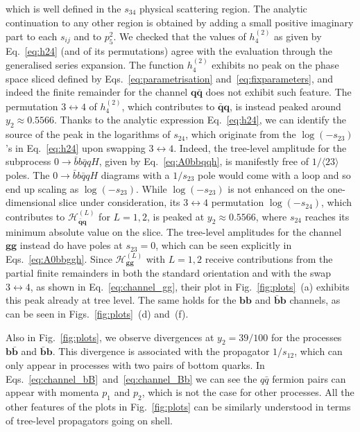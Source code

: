 \documentclass[main.tex]{subfiles}
\begin{document}
which is well defined in the $s_{34}$ physical scattering region. The analytic continuation to any other region is obtained by adding a small positive imaginary part to each $s_{ij}$ and to $p_5^2$. We checked that the values of $h^{(2)}_4$ as given by Eq.~\ref{eq:h24} (and of its permutations) agree with the evaluation through the generalised series expansion. The function $h^{(2)}_4$ exhibits no peak on the phase space sliced defined by Eqs.~\ref{eq:parametrisation} and~\ref{eq:fixparameters}, and indeed the finite remainder for the channel $\mathbf{q\bar{q}}$ does not exhibit such feature. The permutation $3\leftrightarrow 4$ of $h^{(2)}_4$, which contributes to $\mathbf{\bar{q}q}$, is instead peaked around $y_2 \approx 0.5566$. Thanks to the analytic expression Eq.~\ref{eq:h24}, we can identify the source of the peak in the logarithms of $s_{24}$, which originate from the $\log (-s_{23})$'s in Eq.~\ref{eq:h24} upon swapping $3\leftrightarrow 4$. Indeed, the tree-level amplitude for the subprocess $0\to\bar{b} b \bar{q} q H$, given by Eq.~\ref{eq:A0bbqqh}, is manifestly free of $1/\langle 23 \rangle$ poles. The $0\to\bar{b} b \bar{q} q H$ diagrams with a $1/s_{23}$ pole would come with a loop and so end up scaling as $\log(-s_{23})$. While $\log(-s_{23})$ is not enhanced on the one-dimensional slice under consideration, its $3\leftrightarrow4$ permutation $\log(-s_{24})$, which contributes to $\mathcal{H}^{(L)}_{\mathbf{\bar{q}q}}$ for $L=1,2$, is peaked at $y_2 \approx 0.5566$, where $s_{24}$ reaches its minimum absolute value on the slice. 
The tree-level amplitudes for the channel $\mathbf{gg}$ instead do have poles at $s_{23}=0$, which
can be seen explicitly in Eqs.~\ref{eq:A0bbggh}. Since $\mathcal{H}^{(L)}_{\mathbf{gg}}$ with
$L=1,2$ receive contributions from the partial finite remainders in both the standard orientation
and with the swap $3\leftrightarrow4$, as shown in Eq.~\ref{eq:channel_gg}, their plot in Fig.~\ref{fig:plots}~(a) exhibits this peak already at tree level. The same holds for the $\mathbf{bb}$ and $\mathbf{\bar{b}b}$ channels, as can be seen in Figs.~\ref{fig:plots}~(d) and~(f). 

Also in Fig.~\ref{fig:plots}, we observe divergences at $y_2 = 39/100$ for the processes
$\mathbf{b\bar{b}}$ and $\mathbf{\bar{b}b}$. This divergence is associated with the propagator
$1/s_{12}$, which can only appear in processes with two pairs of bottom quarks. In Eqs.~\ref{eq:channel_bB}~and~\ref{eq:channel_Bb} 
we can see the $q\bar{q}$ fermion pairs can appear
with momenta $p_1$ and $p_2$, which is not the case for other processes. All the other features of the plots
in Fig.~\ref{fig:plots} can be similarly understood in terms of tree-level propagators going on shell.
\end{document}
